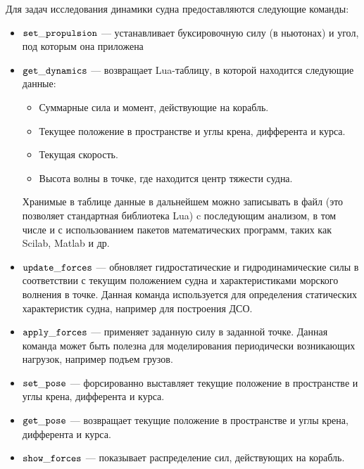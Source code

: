 Для задач исследования динамики судна предоставляются следующие команды:
\begin{itemize}
	\item	$\tt set\_propulsion$ --- устанавливает буксировочную силу (в ньютонах) и угол, 
			под которым она приложена
	\item	$\tt get\_dynamics$ --- возвращает Lua-таблицу, в которой находится следующие данные:
	\begin{itemize}
		\item	Суммарные сила и момент, действующие на корабль.
		\item	Текущее положение в пространстве и углы крена, дифферента и курса.
		\item	Текущая скорость.
		\item	Высота волны в точке, где находится центр тяжести судна.
	\end{itemize}
	Хранимые в таблице данные в дальнейшем можно записывать 
	в файл (это позволяет стандартная библиотека Lua) c последующим анализом, 
	в том числе и с использованием пакетов математических программ, таких как Scilab, Matlab и др.
	\item	$\tt update\_forces$ --- обновляет гидростатические и гидродинамические силы
			в соответствии с текущим положением судна и характеристиками морского волнения в точке. 
			Данная команда используется для определения статических характеристик судна, 
			например для построения ДСО.
	\item	$\tt apply\_forces$ --- применяет заданную силу в заданной точке. 
			Данная команда может быть полезна для моделирования периодически возникающих нагрузок, 
			например подъем грузов.
	\item	$\tt set\_pose$ --- форсированно выставляет текущие положение в пространстве 
			и углы крена, дифферента и курса.
	\item	$\tt get\_pose$ --- возвращает текущие положение в пространстве 
			и углы крена, дифферента и курса.
	\item	$\tt show\_forces$ --- показывает распределение сил, действующих на корабль.
\end{itemize}


